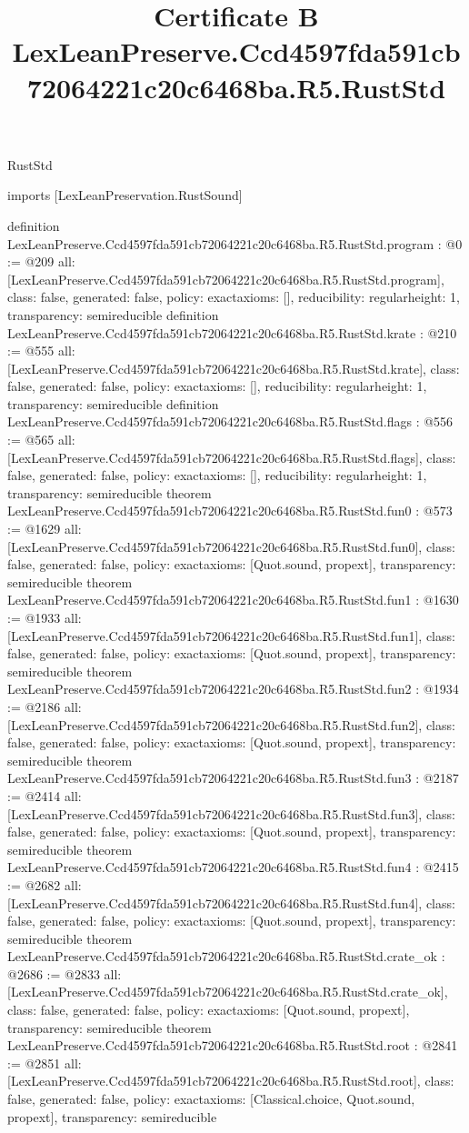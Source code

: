 \begin{lexlean}{RustStd}
\title{Certificate B LexLeanPreserve.Ccd4597fda591cb72064221c20c6468ba.R5.RustStd}
\begin{coremodule}
imports [LexLeanPreservation.RustSound]

definition LexLeanPreserve.Ccd4597fda591cb72064221c20c6468ba.R5.RustStd.program : @0 := @209 {
  all: [LexLeanPreserve.Ccd4597fda591cb72064221c20c6468ba.R5.RustStd.program],
  class: false,
  generated: false,
  policy: exact{axioms: []},
  reducibility: regular{height: 1},
  transparency: semireducible
}
definition LexLeanPreserve.Ccd4597fda591cb72064221c20c6468ba.R5.RustStd.krate : @210 := @555 {
  all: [LexLeanPreserve.Ccd4597fda591cb72064221c20c6468ba.R5.RustStd.krate],
  class: false,
  generated: false,
  policy: exact{axioms: []},
  reducibility: regular{height: 1},
  transparency: semireducible
}
definition LexLeanPreserve.Ccd4597fda591cb72064221c20c6468ba.R5.RustStd.flags : @556 := @565 {
  all: [LexLeanPreserve.Ccd4597fda591cb72064221c20c6468ba.R5.RustStd.flags],
  class: false,
  generated: false,
  policy: exact{axioms: []},
  reducibility: regular{height: 1},
  transparency: semireducible
}
theorem LexLeanPreserve.Ccd4597fda591cb72064221c20c6468ba.R5.RustStd.fun0 : @573 := @1629 {
  all: [LexLeanPreserve.Ccd4597fda591cb72064221c20c6468ba.R5.RustStd.fun0],
  class: false,
  generated: false,
  policy: exact{axioms: [Quot.sound, propext]},
  transparency: semireducible
}
theorem LexLeanPreserve.Ccd4597fda591cb72064221c20c6468ba.R5.RustStd.fun1 : @1630 := @1933 {
  all: [LexLeanPreserve.Ccd4597fda591cb72064221c20c6468ba.R5.RustStd.fun1],
  class: false,
  generated: false,
  policy: exact{axioms: [Quot.sound, propext]},
  transparency: semireducible
}
theorem LexLeanPreserve.Ccd4597fda591cb72064221c20c6468ba.R5.RustStd.fun2 : @1934 := @2186 {
  all: [LexLeanPreserve.Ccd4597fda591cb72064221c20c6468ba.R5.RustStd.fun2],
  class: false,
  generated: false,
  policy: exact{axioms: [Quot.sound, propext]},
  transparency: semireducible
}
theorem LexLeanPreserve.Ccd4597fda591cb72064221c20c6468ba.R5.RustStd.fun3 : @2187 := @2414 {
  all: [LexLeanPreserve.Ccd4597fda591cb72064221c20c6468ba.R5.RustStd.fun3],
  class: false,
  generated: false,
  policy: exact{axioms: [Quot.sound, propext]},
  transparency: semireducible
}
theorem LexLeanPreserve.Ccd4597fda591cb72064221c20c6468ba.R5.RustStd.fun4 : @2415 := @2682 {
  all: [LexLeanPreserve.Ccd4597fda591cb72064221c20c6468ba.R5.RustStd.fun4],
  class: false,
  generated: false,
  policy: exact{axioms: [Quot.sound, propext]},
  transparency: semireducible
}
theorem LexLeanPreserve.Ccd4597fda591cb72064221c20c6468ba.R5.RustStd.crate_ok : @2686 := @2833 {
  all: [LexLeanPreserve.Ccd4597fda591cb72064221c20c6468ba.R5.RustStd.crate_ok],
  class: false,
  generated: false,
  policy: exact{axioms: [Quot.sound, propext]},
  transparency: semireducible
}
theorem LexLeanPreserve.Ccd4597fda591cb72064221c20c6468ba.R5.RustStd.root : @2841 := @2851 {
  all: [LexLeanPreserve.Ccd4597fda591cb72064221c20c6468ba.R5.RustStd.root],
  class: false,
  generated: false,
  policy: exact{axioms: [Classical.choice, Quot.sound, propext]},
  transparency: semireducible
}


\end{coremodule}
\end{lexlean}

